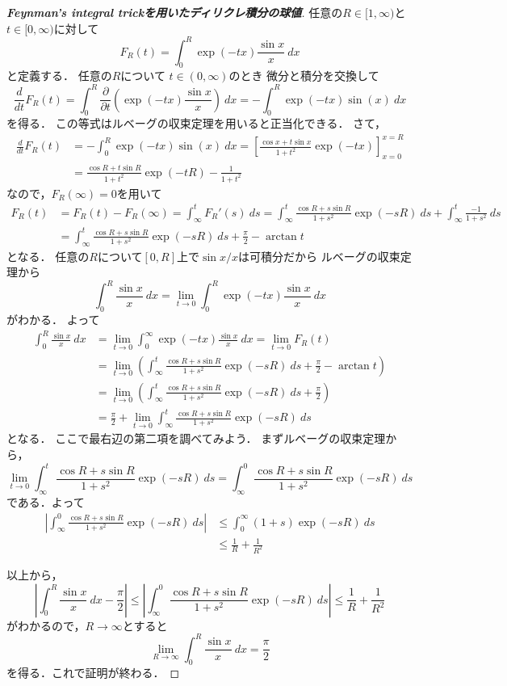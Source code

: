 \documentclass[leqno, 12pt]{jsarticle}
\begin{document}
\begin{proof}[\textbf{Feynman's integral trickを用いたディリクレ積分の球値}]
任意の$R\in [1, \infty)$と$t\in [0, \infty)$に対して
\[
F_R(t)=\int_{0}^{R}\exp(-tx)\frac{\sin x}{x}\ dx
\]
と定義する．
任意の$R$について
$t\in (0, \infty)$のとき
微分と積分を交換して
\[
	\frac{d}{dt}F_R(t)
	=
	\int_{0}^{R}
	\frac{\partial }{\partial t}
	\left(\exp(-tx)\frac{\sin x}{x}\right)\ dx
	=
	-\int_{0}^{R}\exp(-tx)\sin(x)\ dx
\]
を得る．
この等式はルベーグの収束定理を用いると正当化できる．
さて，
\begin{align*}
	\frac{d}{dt}F_R(t)
	&=-\int_{0}^{R}
	\exp(-tx)\sin(x)\ dx
	=
	\left[\frac{\cos x+t\sin x}{1+t^2}\exp(-tx)\right]_{x=0}^{x=R}
	\\
	&=
	\frac{\cos R+t\sin R}{1+t^2}\exp(-tR)
	-\frac{1}{1+t^2}
\end{align*}
なので，$F_R(\infty)=0$を用いて
\begin{align*}
	F_R(t)
	&=
	F_R(t)-F_R(\infty)
	=
	\int_{\infty}^tF_R'(s)\ ds
	=
	\int_{\infty}^{t}\frac{\cos R+s\sin R}{1+s^2}\exp(-sR)\ ds
	+
	\int_{\infty}^t\frac{-1}{1+s^2}\ ds
	\\
	&=
	\int_{\infty}^{t}\frac{\cos R+s\sin R}{1+s^2}\exp(-sR)\ ds
	+
	\frac{\pi}{2}-\arctan t
\end{align*}
となる．
任意の$R$について$[0, R]$上で$\sin x/x$は可積分だから
ルベーグの収束定理から
\[
	\int_0^{R}\frac{\sin x}{x}\ dx
	=
	\lim_{t\to  0}\int_{0}^{R}\exp(-tx)\frac{\sin x}{x}\ dx
\]
がわかる．
よって
\begin{align*}
	\int_0^{R}\frac{\sin x}{x}\ dx
	&=
	\lim_{t\to 0}\int_{0}^{\infty}\exp(-tx)\frac{\sin x}{x}\ dx
	=\lim_{t\to 0}F_R(t)
	\\
	&=
	\lim_{t\to 0}
	\left(
	\int_{\infty}^{t}\frac{\cos R+s\sin R}{1+s^2}\exp(-sR)\ ds
	+
	\frac{\pi}{2}-\arctan t
	\right)
	\\
	&=
	\lim_{t\to 0}
	\left(
	\int_{\infty}^{t}\frac{\cos R+s\sin R}{1+s^2}\exp(-sR)\ ds
	+
	\frac{\pi}{2}
	\right)\\
	&=
	\frac{\pi}{2}+
	\lim_{t\to 0}
	\int_{\infty}^{t}\frac{\cos R+s\sin R}{1+s^2}\exp(-sR)\ ds
\end{align*}
となる．
ここで最右辺の第二項を調べてみよう．
まずルベーグの収束定理から，
\[
	\lim_{t\to 0}
	\int_{\infty}^{t}\frac{\cos R+s\sin R}{1+s^2}\exp(-sR)\ ds
	=
	\int_{\infty}^{0}\frac{\cos R+s\sin R}{1+s^2}\exp(-sR)\ ds
\]
である．よって
\begin{align*}
	\left|
	\int_{\infty}^{0}\frac{\cos R+s\sin R}{1+s^2}\exp(-sR)\ ds
	\right|
	&\le 
	\int_{0}^{\infty}(1+s)\exp(-sR)\ ds
	\\
	&\le 
	\frac{1}{R}+\frac{1}{R^2}
\end{align*}

以上から，
\[
	\left|
	\int_0^{R}\frac{\sin x}{x}\ dx
	-\frac{\pi}{2}
	\right|
	\le 
	\left|
	\int_{\infty}^{0}\frac{\cos R+s\sin R}{1+s^2}\exp(-sR)\ ds
	\right|
	\le 
	\frac{1}{R}+\frac{1}{R^2}
\]
がわかるので，$R\to \infty$とすると
\[
\lim_{R\to \infty}\int_0^{R}\frac{\sin x}{x}\ dx=\frac{\pi}{2}
\]
を得る．これで証明が終わる．
\end{proof}
\end{document}
